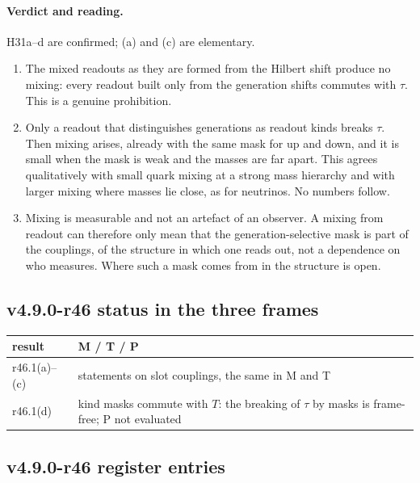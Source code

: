 \paragraph{Verdict and reading.}
H31a--d are confirmed; (a) and (c) are elementary.
\begin{enumerate}[leftmargin=2em]
\item The mixed readouts as they are formed from the Hilbert shift produce no mixing: every readout built only from the generation shifts
commutes with \(\tau\).  This is a genuine prohibition.
\item Only a readout that distinguishes generations as readout kinds breaks \(\tau\).  Then mixing arises, already with the same mask for up and
down, and it is small when the mask is weak and the masses are far apart.  This agrees qualitatively with small quark mixing at a strong mass
hierarchy and with larger mixing where masses lie close, as for neutrinos.  No numbers follow.
\item Mixing is measurable and not an artefact of an observer.  A mixing from readout can therefore only mean that the generation-selective
mask is part of the couplings, of the structure in which one reads out, not a dependence on who measures.  Where such a mask comes from in the
structure is open.
\end{enumerate}

\subsection*{v4.9.0-r46 status in the three frames}
\label{subsec:v490-r46-frames}

\begin{center}
\small
\begin{tabular}{@{}>{\raggedright\arraybackslash}p{}>{\raggedright\arraybackslash}p{}@{}}
\toprule
result & M / T / P\\
\midrule
r46.1(a)--(c) & statements on slot couplings, the same in M and T\\
r46.1(d) & kind masks commute with \(T\): the breaking of \(\tau\) by masks is frame-free; P not evaluated\\
\bottomrule
\end{tabular}
\end{center}

\subsection*{v4.9.0-r46 register entries}
\label{subsec:v490-r46-register}

